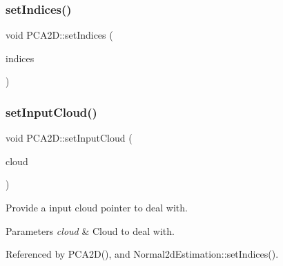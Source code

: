 \mbox{\label{classPCA2D_aa5b9ccb12b5ce673ac851a2a5c4f4f97}} 
\subsubsection{\texorpdfstring{set\+Indices()}{setIndices()}\hspace{0.1cm}{\footnotesize\ttfamily [10/10]}}
{\footnotesize\ttfamily void P\+C\+A2\+D\+::set\+Indices (\begin{DoxyParamCaption}\item[{const std\+::vector$<$ int $>$ \&}]{indices }\end{DoxyParamCaption})\hspace{0.3cm}{\ttfamily [inline]}}

\mbox{\label{classPCA2D_ad3583e82b8d9b97f3f7253fd78af1dcc}} 
\subsubsection{\texorpdfstring{set\+Input\+Cloud()}{setInputCloud()}\hspace{0.1cm}{\footnotesize\ttfamily [1/2]}}
{\footnotesize\ttfamily void P\+C\+A2\+D\+::set\+Input\+Cloud (\begin{DoxyParamCaption}\item[{const \hyperlink{Normal2dEstimation_8h_a389a43addc496dc19a5bb0575cc60bc4}{Const\+Ptr\+Cloud} \&}]{cloud }\end{DoxyParamCaption})}



Provide a input cloud pointer to deal with. 


\begin{DoxyParams}{Parameters}
{\em cloud} & Cloud to deal with. \\
\hline
\end{DoxyParams}


Referenced by P\+C\+A2\+D(), and Normal2d\+Estimation\+::set\+Indices().

\mbox{\label{classPCA2D_ad3583e82b8d9b97f3f7253fd78af1dcc}} 
